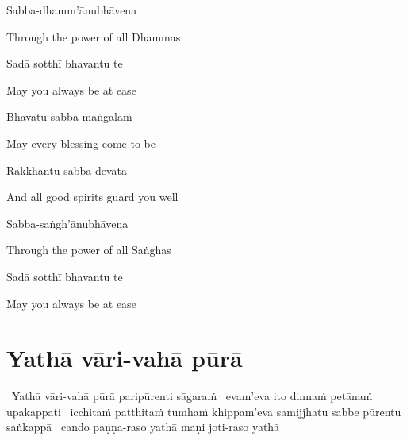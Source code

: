 Sabba-dhamm'ānubhāvena

\begin{english}
  Through the power of all Dhammas
\end{english}

Sadā sotthī bhavantu te

\begin{english}
  May you always be at ease
\end{english}

Bhavatu sabba-maṅgalaṁ

\begin{english}
  May every blessing come to be
\end{english}

Rakkhantu sabba-devatā

\begin{english}
  And all good spirits guard you well
\end{english}

Sabba-saṅgh'ānubhāvena

\begin{english}
  Through the power of all Saṅghas
\end{english}

Sadā sotthī bhavantu te

\begin{english}
  May you always be at ease
\end{english}

\suttaRef{[Trad]}


\clearpage

\setsecheadstyle{\subsectionFmt}
\section{Yathā vāri-vahā pūrā}
\label{yatha-vari-vaha-pura}

\anglebracketleft\ \hspace{-0.5mm}Yathā vāri-vahā pūrā paripūrenti sāgaraṁ \breathmark\ evam'eva ito dinnaṁ petānaṁ upakappati \breathmark\ icchitaṁ patthitaṁ tumhaṁ khippam'eva samijjhatu sabbe pūrentu saṅkappā \breathmark\ cando paṇṇa-raso yathā maṇi joti-raso yathā\makeatletter\hyperlink{endnote119-appendix}\makeatother \thinspace\hspace{-0.5mm}\anglebracketright\

